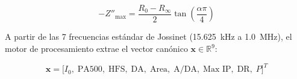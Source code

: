 \documentclass[11pt,a4paper]{article}
\begin{document}
\begin{equation}
    -Z''_{\max} = \frac{R_0 - R_\infty}{2} \tan\left(\frac{\alpha \pi}{4}\right)
    \label{eq:max_ip}
\end{equation}

A partir de las 7 frecuencias estándar de Jossinet \cite{jossinet1996, uci_breast_tissue, kaggle_breast_tissue} (15.625~kHz a 1.0~MHz), el motor de procesamiento extrae el vector canónico $\mathbf{x} \in \mathbb{R}^9$:

\begin{equation}
    \mathbf{x} = \Big[ I_0,\; \text{PA500},\; \text{HFS},\; \text{DA},\; \text{Area},\; \text{A/DA},\; \text{Max IP},\; \text{DR},\; P \Big]^T
    \label{eq:vector_x}
\end{equation}

\end{document}
